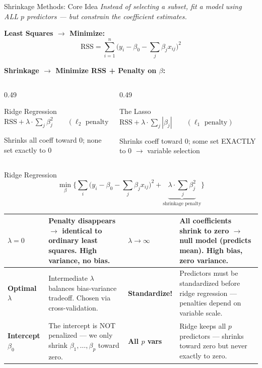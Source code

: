 \documentclass[ignorenonframetext,]{beamer}
\begin{document}
\begin{frame}{Shrinkage Methods: Core Idea}
\emph{\small Instead of selecting a subset, fit a model using ALL $p$ predictors --- but constrain the coefficient estimates.}

\textbf{Least Squares $\rightarrow$ Minimize:}
$$\mathrm{RSS} = \sum_{i=1}^n \Big(y_i - \beta_0 - \sum_j \beta_j x_{ij}\Big)^2$$

\textbf{Shrinkage $\rightarrow$ Minimize RSS + Penalty on $\beta$:}

\begin{columns}[T]
\begin{column}{0.49\textwidth}
\begin{block}{\small Ridge Regression}
\footnotesize
$\mathrm{RSS} + \lambda\cdot\sum_j \beta_j^2 \qquad (\ell_2 \text{ penalty})$

\vspace{4pt}
Shrinks all coeff toward 0; none set exactly to 0
\end{block}
\end{column}
\begin{column}{0.49\textwidth}
\begin{exampleblock}{\small The Lasso}
\footnotesize
$\mathrm{RSS} + \lambda\cdot\sum_j |\beta_j| \qquad (\ell_1 \text{ penalty})$

\vspace{4pt}
Shrinks coeff toward 0; some set EXACTLY to 0 $\rightarrow$ variable selection
\end{exampleblock}
\end{column}
\end{columns}
\end{frame}

\begin{frame}{Ridge Regression}
{\small$$\min_{\beta}\bigg\{\sum_i \Big(y_i - \beta_0 - \sum_j \beta_j x_{ij}\Big)^2 + \underbrace{\lambda\cdot\sum_j \beta_j^2}_{\text{shrinkage penalty}}\bigg\}$$}

\scriptsize
\begin{tabular}{@{}>{\bfseries}p{}p{}|>{\bfseries}p{}p{}@{}}
\toprule
$\lambda = 0$ & Penalty disappears $\rightarrow$ identical to ordinary least squares. High variance, no bias.
& $\lambda \rightarrow \infty$ & All coefficients shrink to zero $\rightarrow$ null model (predicts mean). High bias, zero variance.\\
\midrule
Optimal $\lambda$ & Intermediate $\lambda$ balances bias-variance tradeoff. Chosen via cross-validation.
& Standard\-ize! & Predictors must be standardized before ridge regression --- penalties depend on variable scale.\\
\midrule
Intercept $\beta_0$ & The intercept is NOT penalized --- we only shrink $\beta_1, \ldots, \beta_p$ toward zero.
& All $p$ vars & Ridge keeps all $p$ predictors --- shrinks toward zero but never exactly to zero.\\
\bottomrule
\end{tabular}
\end{frame}
\end{document}
